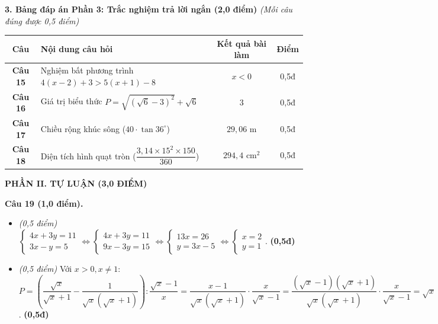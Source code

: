 \documentclass[11pt,a4paper]{article}
\begin{document}
\vspace{2mm}
\noindent
\textbf{3. Bảng đáp án Phần 3: Trắc nghiệm trả lời ngắn (2,0 điểm)} \textit{(Mỗi câu đúng được 0,5 điểm)}
\begin{center}
\begin{tabular}{|c|l|c|c|}
\hline
\textbf{Câu} & \textbf{Nội dung câu hỏi} & \textbf{Kết quả bài làm} & \textbf{Điểm} \\
\hline
\textbf{Câu 15} & Nghiệm bất phương trình $4(x - 2) + 3 > 5(x + 1) - 8$ & \textbf{$x < 0$} & 0,5đ \\
\hline
\textbf{Câu 16} & Giá trị biểu thức $P = \sqrt{(\sqrt{6}-3)^2} + \sqrt{6}$ & \textbf{$3$} & 0,5đ \\
\hline
\textbf{Câu 17} & Chiều rộng khúc sông ($40 \cdot \tan 36^\circ$) & \textbf{$29{,}06\text{ m}$} & 0,5đ \\
\hline
\textbf{Câu 18} & Diện tích hình quạt tròn ($\dfrac{3{,}14 \times 15^2 \times 150}{360}$) & \textbf{$294{,}4\text{ cm}^2$} & 0,5đ \\
\hline
\end{tabular}
\end{center}

\vspace{3mm}
\noindent
\textbf{\large PHẦN II. TỰ LUẬN (3,0 ĐIỂM)}

\vspace{2mm}
\textbf{Câu 19 (1,0 điểm).}
\begin{itemize}
  \item[a)] \textit{(0,5 điểm)} $\begin{cases} 4x + 3y = 11 \\ 3x - y = 5 \end{cases} \Leftrightarrow \begin{cases} 4x + 3y = 11 \\ 9x - 3y = 15 \end{cases} \Leftrightarrow \begin{cases} 13x = 26 \\ y = 3x - 5 \end{cases} \Leftrightarrow \begin{cases} x = 2 \\ y = 1 \end{cases}$. \hfill \textbf{(0,5đ)}
  \item[b)] \textit{(0,5 điểm)} Với $x > 0, x \ne 1$:
  $P = \left( \dfrac{\sqrt{x}}{\sqrt{x}+1} - \dfrac{1}{\sqrt{x}(\sqrt{x}+1)} \right) : \dfrac{\sqrt{x}-1}{x} = \dfrac{x - 1}{\sqrt{x}(\sqrt{x}+1)} \cdot \dfrac{x}{\sqrt{x}-1} = \dfrac{(\sqrt{x}-1)(\sqrt{x}+1)}{\sqrt{x}(\sqrt{x}+1)} \cdot \dfrac{x}{\sqrt{x}-1} = \sqrt{x}$. \hfill \textbf{(0,5đ)}
\end{itemize}
\end{document}
